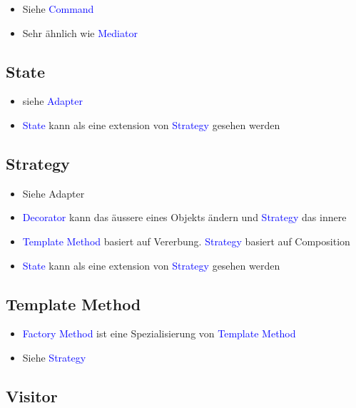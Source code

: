 \begin{itemize}
    \item Siehe \textcolor{blue}{Command}
    \item Sehr ähnlich wie \textcolor{blue}{Mediator}
\end{itemize}

\subsection{State}

\begin{itemize}
    \item siehe \textcolor{blue}{Adapter}
    \item \textcolor{blue}{State} kann als eine extension von \textcolor{blue}{Strategy} gesehen werden
\end{itemize}

\subsection{Strategy}

\begin{itemize}
    \item Siehe Adapter
    \item \textcolor{blue}{Decorator} kann das äussere eines Objekts ändern und \textcolor{blue}{Strategy} das innere
    \item \textcolor{blue}{Template Method} basiert auf Vererbung. \textcolor{blue}{Strategy} basiert auf Composition
    \item \textcolor{blue}{State} kann als eine extension von \textcolor{blue}{Strategy} gesehen werden
\end{itemize}

\subsection{Template Method}

\begin{itemize}
    \item \textcolor{blue}{Factory Method} ist eine Spezialisierung von \textcolor{blue}{Template Method}
    \item Siehe \textcolor{blue}{Strategy}
\end{itemize}


\subsection{Visitor}

